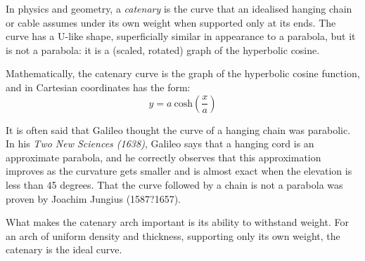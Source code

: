 \documentclass[11pt]{amsart}
\begin{document}
In physics and geometry, a \textit{catenary} is the curve that an idealised hanging chain or cable assumes under its own weight when supported only at its ends. The curve has a U-like shape, superficially similar in appearance to a parabola, but it is not a parabola: it is a (scaled, rotated) graph of the hyperbolic cosine. 

Mathematically, the catenary curve is the graph of the hyperbolic cosine function, and in Cartesian coordinates has the form:
\begin{equation}
y = a \: \mathrm{cosh}(\frac{x}{a})
\end{equation}

It is often said that Galileo thought the curve of a hanging chain was parabolic. In his \textit{Two New Sciences (1638)}, Galileo says that a hanging cord is an approximate parabola, and he correctly observes that this approximation improves as the curvature gets smaller and is almost exact when the elevation is less than 45 degrees. That the curve followed by a chain is not a parabola was proven by Joachim Jungius (1587?1657).

What makes the catenary arch important is its ability to withstand weight. For an arch of uniform density and thickness, supporting only its own weight, the catenary is the ideal curve.
\end{document}
